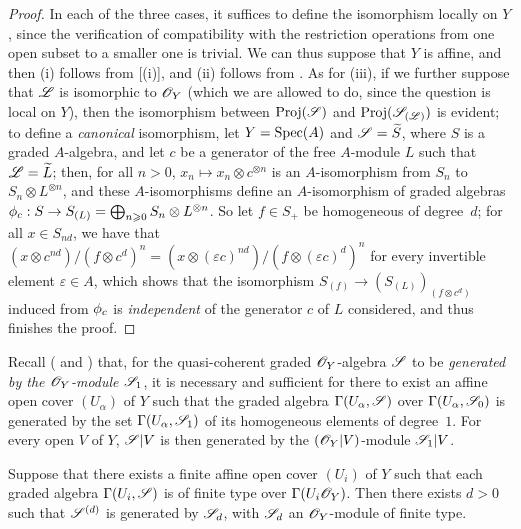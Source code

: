\begin{proof}
In each of the three cases, it suffices to define the isomorphism locally on $Y$, since the verification of compatibility with the restriction operations from one open subset to a smaller one is trivial.
We can thus suppose that $Y$ is affine, and then (i) follows from [(i)], and (ii) follows from .
As for (iii), if we further suppose that $\mathscr{L}$ is isomorphic to $\mathscr{O}_Y$ (which we are allowed to do, since the question is local on $Y$), then the isomorphism between $\operatorname{Proj}(\mathscr{S})$ and $\operatorname{Proj}(\mathscr{S}_{(\mathscr{L})})$ is evident;
to define a \emph{canonical} isomorphism, let $Y=\operatorname{Spec}(A)$ and $\mathscr{S}=\widetilde{S}$, where $S$ is a graded $A$-algebra, and let $c$ be a generator of the free $A$-module $L$ such that $\mathscr{L}=\widetilde{L}$;
then, for all $n>0$, $x_n\mapsto x_n\otimes c^{\otimes n}$ is an $A$-isomorphism from $S_n$ to $S_n\otimes L^{\otimes n}$, and these $A$-isomorphisms define an $A$-isomorphism of graded algebras $\vphi_c:S\to S_{(L)}=\bigoplus_{n\geq0}S_n\otimes L^{\otimes n}$.
So let $f\in S_+$ be homogeneous of degree~$d$;
for all $x\in S_{nd}$, we have that $(x\otimes c^{nd})/(f\otimes c^d)^n=(x\otimes(\varepsilon c)^{nd})/(f\otimes(\varepsilon c)^d)^n$ for every invertible element $\varepsilon\in A$, which shows that the isomorphism $S_{(f)}\to(S_{(L)})_{(f\otimes c^d)}$ induced from $\phi_c$ is \emph{independent} of the generator $c$ of $L$ considered, and thus finishes the proof.
\end{proof}

\begin{env}[3.1.9]
\label{II.3.1.9}
Recall ( and ) that, for the quasi-coherent graded $\mathscr{O}_Y$-algebra $\mathscr{S}$ to be \emph{generated by the $\mathscr{O}_Y$-module $\mathscr{S}_1$}, it is necessary and sufficient for there to exist an affine open cover $(U_\alpha)$ of $Y$ such that the graded algebra $\Gamma(U_\alpha,\mathscr{S})$ over $\Gamma(U_\alpha,\mathscr{S}_0)$ is generated by the set $\Gamma(U_\alpha,\mathscr{S}_1)$ of its homogeneous elements of degree~$1$.
For every open $V$ of $Y$, $\mathscr{S}|V$ is then generated by the $(\mathscr{O}_Y|V)$-module $\mathscr{S}_1|V$.
\end{env}

\begin{proposition}[3.1.10]
\label{II.3.1.10}
Suppose that there exists a finite affine open cover $(U_i)$ of $Y$ such that each graded algebra $\Gamma(U_i,\mathscr{S})$ is of finite type over $\Gamma(U_i\mathscr{O}_Y)$.
Then there exists $d>0$ such that $\mathscr{S}^{(d)}$ is generated by $\mathscr{S}_d$, with $\mathscr{S}_d$ an $\mathscr{O}_Y$-module of finite type.
\end{proposition}

